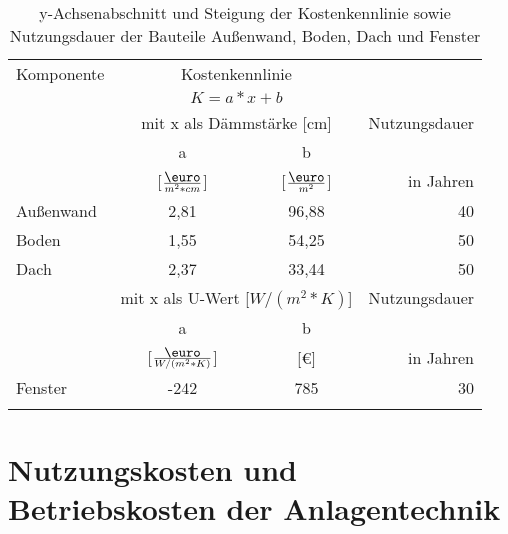 \begin{table}[H]\centering
\begin{tabular}{lccr}
\toprule[1.5pt]
Komponente & \multicolumn{2}{c}{Kostenkennlinie} & \\ 
  & \multicolumn{2}{c}{\(K = a*x + b\)} & \\ 
  & \multicolumn{2}{c}{mit x als Dämmstärke [cm]} & Nutzungsdauer \\ 
\midrule[1.5pt]
  & a & b & \\
  & [\(\frac{\mbox{\euro}}{m^2*cm}\)] & [\(\frac{\mbox{\euro}}{m^2}\)] & in Jahren\\ 
\midrule[1pt]
 Außenwand & 2,81 & 96,88 & 40 \\
\midrule
 Boden & 1,55 & 54,25 & 50 \\
\midrule
 Dach & 2,37 & 33,44 & 50 \\ \addlinespace[5pt]
\midrule[1.5pt]
  & \multicolumn{2}{c}{mit x als U-Wert [\(W/(m^2*K)\)]} & Nutzungsdauer \\ 
\midrule[1pt]
 & a & b & \\
 & [\(\frac{\mbox{\euro}}{W/(m^2*K)}\)] & [€] & in Jahren \\
\midrule[1pt]
 Fenster & -242 & 785 & 30 \\
\bottomrule[1.5pt] \addlinespace[10pt]
\end{tabular}
\caption{y-Achsenabschnitt und Steigung der Kostenkennlinie sowie Nutzungsdauer der Bauteile Außenwand, Boden, Dach und Fenster \cite{Hinz.10.08.2015}}
\label{tab: TabelleA4}
\end{table}

\section{Nutzungskosten und Betriebskosten der Anlagentechnik}

